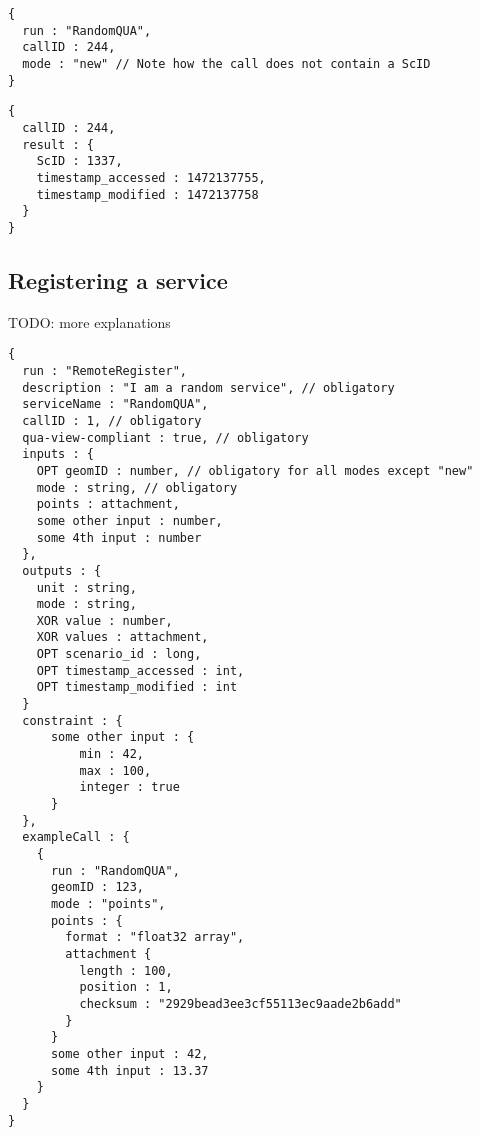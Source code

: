 \begin{lstlisting}[caption={A qua-compliant service run request for mode \texttt{new}}, label={lst:quacompliantinput:new}]
{
  run : "RandomQUA",
  callID : 244,
  mode : "new" // Note how the call does not contain a ScID
}
\end{lstlisting}

\begin{lstlisting}[caption={A qua-compliant service output for mode \texttt{new}}, label={lst:quacompliantresult:new}]
{
  callID : 244,
  result : {
    ScID : 1337,
    timestamp_accessed : 1472137755,
    timestamp_modified : 1472137758
  }
}
\end{lstlisting}

\subsection{Registering a service}

TODO: more explanations

\begin{lstlisting}[caption={Registering a QUA-compliant service}, label={lst:quacompliance}]
{
  run : "RemoteRegister",
  description : "I am a random service", // obligatory
  serviceName : "RandomQUA",
  callID : 1, // obligatory
  qua-view-compliant : true, // obligatory
  inputs : {
    OPT geomID : number, // obligatory for all modes except "new"
    mode : string, // obligatory
    points : attachment,
    some other input : number,
    some 4th input : number
  },
  outputs : {
    unit : string,
    mode : string,
    XOR value : number,
    XOR values : attachment,
    OPT scenario_id : long,
    OPT timestamp_accessed : int,
    OPT timestamp_modified : int
  }
  constraint : {
      some other input : {
          min : 42,
          max : 100,
          integer : true
      }
  },
  exampleCall : {
    {
      run : "RandomQUA",
      geomID : 123,
      mode : "points",
      points : {
        format : "float32 array",
        attachment {
          length : 100,
          position : 1,
          checksum : "2929bead3ee3cf55113ec9aade2b6add"
        }
      }
      some other input : 42,
      some 4th input : 13.37
    }
  }
}
\end{lstlisting}


\clearpage
